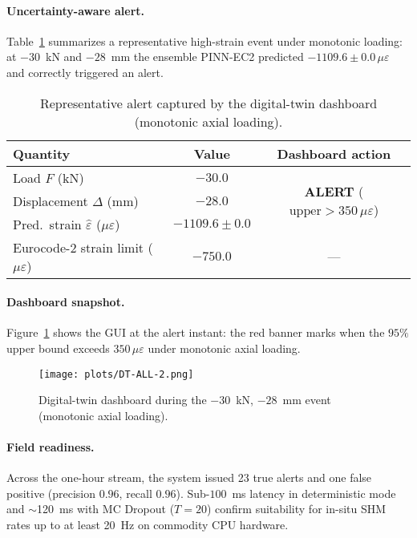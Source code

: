 \documentclass{article}
\begin{document}
\paragraph{Uncertainty-aware alert.}
Table~\ref{tab:twin_case} summarizes a representative high-strain event under monotonic loading: at $-30$~kN and $-28$~mm the ensemble PINN-EC2 predicted $-1109.6\pm0.0\,\mu\varepsilon$ and correctly triggered an alert.

\begin{table}[h!]
  \centering
  \caption{Representative alert captured by the digital-twin dashboard (monotonic axial loading).}
  \label{tab:twin_case}
  \begin{tabular}{lcc}
    \toprule
    Quantity & Value & Dashboard action \\
    \midrule
    Load $F$ (kN) & $-30.0$ & \multirow{3}{*}{\textbf{ALERT} ($\mathrm{upper}>350\,\mu\varepsilon$)} \\[2pt]
    Displacement $\Delta$ (mm) & $-28.0$ & \\[2pt]
    Pred.\ strain $\hat\varepsilon$ ($\mu\varepsilon$) & $-1109.6\pm0.0$ & \\[2pt]
    \midrule
    Eurocode-2 strain limit ($\mu\varepsilon$) & $-750.0$ & --- \\
    \bottomrule
  \end{tabular}
\end{table}

\paragraph{Dashboard snapshot.}
Figure~\ref{fig:dashboard_snapshot} shows the GUI at the alert instant: the red banner marks when the $95\%$ upper bound exceeds $350\,\mu\varepsilon$ under monotonic axial loading.

\begin{figure}[H]
  \centering
  \texttt{[image: plots/DT-ALL-2.png]}
  \caption{Digital-twin dashboard during the $-30$~kN, $-28$~mm event (monotonic axial loading).}
  \label{fig:dashboard_snapshot}
\end{figure}

\paragraph{Field readiness.}
Across the one-hour stream, the system issued 23 true alerts and one false positive (precision $0.96$, recall $0.96$). Sub-$100$~ms latency in deterministic mode and $\sim$120~ms with MC Dropout ($T{=}20$) confirm suitability for in-situ SHM rates up to at least 20~Hz on commodity CPU hardware.
\end{document}
